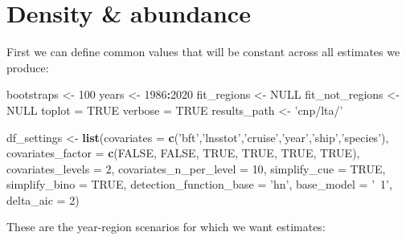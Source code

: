 \documentclass[
]{book}
\newenvironment{Shaded}{\begin{snugshade}}{\end{snugshade}}
\newcommand{\DataTypeTok}[1]{\textcolor[rgb]{0.13,0.29,0.53}{#1}}
\newcommand{\DecValTok}[1]{\textcolor[rgb]{0.00,0.00,0.81}{#1}}
\newcommand{\KeywordTok}[1]{\textcolor[rgb]{0.13,0.29,0.53}{\textbf{#1}}}
\newcommand{\NormalTok}[1]{#1}
\newcommand{\OperatorTok}[1]{\textcolor[rgb]{0.81,0.36,0.00}{\textbf{#1}}}
\newcommand{\OtherTok}[1]{\textcolor[rgb]{0.56,0.35,0.01}{#1}}
\newcommand{\StringTok}[1]{\textcolor[rgb]{0.31,0.60,0.02}{#1}}
\begin{document}
\hypertarget{density-abundance-1}{%
\section*{Density \& abundance}\label{density-abundance-1}}

First we can define common values that will be constant across all estimates we produce:

\begin{Shaded}
\begin{Highlighting}[]
\NormalTok{bootstraps <-}\StringTok{ }\DecValTok{100}
\NormalTok{years <-}\StringTok{ }\DecValTok{1986}\OperatorTok{:}\DecValTok{2020}
\NormalTok{fit_regions <-}\StringTok{ }\OtherTok{NULL}
\NormalTok{fit_not_regions <-}\StringTok{ }\OtherTok{NULL}
\NormalTok{toplot =}\StringTok{ }\OtherTok{TRUE}
\NormalTok{verbose =}\StringTok{ }\OtherTok{TRUE}
\NormalTok{results_path <-}\StringTok{ 'cnp/lta/'}

\NormalTok{df_settings <-}
\StringTok{  }\KeywordTok{list}\NormalTok{(}\DataTypeTok{covariates =} \KeywordTok{c}\NormalTok{(}\StringTok{'bft'}\NormalTok{,}\StringTok{'lnsstot'}\NormalTok{,}\StringTok{'cruise'}\NormalTok{,}\StringTok{'year'}\NormalTok{,}\StringTok{'ship'}\NormalTok{,}\StringTok{'species'}\NormalTok{),}
       \DataTypeTok{covariates_factor =} \KeywordTok{c}\NormalTok{(}\OtherTok{FALSE}\NormalTok{, }\OtherTok{FALSE}\NormalTok{, }\OtherTok{TRUE}\NormalTok{, }\OtherTok{TRUE}\NormalTok{, }\OtherTok{TRUE}\NormalTok{, }\OtherTok{TRUE}\NormalTok{),}
       \DataTypeTok{covariates_levels =} \DecValTok{2}\NormalTok{,}
       \DataTypeTok{covariates_n_per_level =} \DecValTok{10}\NormalTok{,}
       \DataTypeTok{simplify_cue =} \OtherTok{TRUE}\NormalTok{,}
       \DataTypeTok{simplify_bino =} \OtherTok{TRUE}\NormalTok{,}
       \DataTypeTok{detection_function_base =} \StringTok{'hn'}\NormalTok{,}
       \DataTypeTok{base_model =} \StringTok{'~1'}\NormalTok{,}
       \DataTypeTok{delta_aic =} \DecValTok{2}\NormalTok{)}
\end{Highlighting}
\end{Shaded}

These are the year-region scenarios for which we want estimates:
\end{document}
